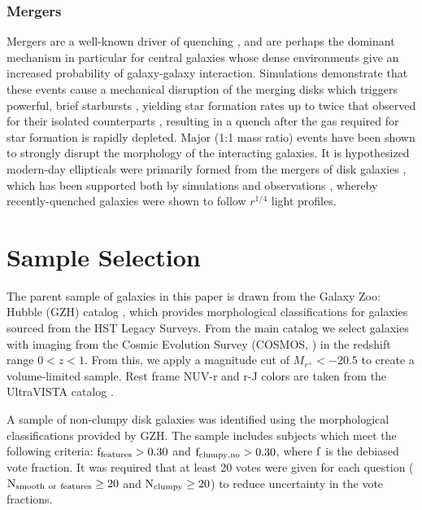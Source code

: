 \subsubsection{Mergers}
Mergers are a well-known driver of quenching \citep{Peng2010}, and are perhaps the dominant mechanism in particular for central galaxies \citet{Smethurst2017} whose dense environments give an increased probability of galaxy-galaxy interaction. Simulations demonstrate that these events cause a mechanical disruption of the merging disks \citep{Pontzen2017} which triggers powerful, brief starbursts \citep{Barnes1996,Hopkins2006}, yielding star formation rates up to twice that observed for their isolated counterparts \citep{Mihos1994}, resulting in a quench after the gas required for star formation is rapidly depleted. Major (1:1 mass ratio) events have been shown to strongly disrupt the morphology of the interacting galaxies. It is hypothesized modern-day ellipticals were primarily formed from the mergers of disk galaxies \citep{Toomre1977,Schweizer1982,Schweizer1990}, which has been supported both by simulations \citep{Mihos1996,Pontzen2017} and observations \citep{Schweizer1982,Wright1990,Stanford1991}, whereby recently-quenched galaxies were shown to follow $r^{1/4}$ light profiles. 


\section{Sample Selection}
\label{sec:reddisksample}

The parent sample of galaxies in this paper is drawn from the Galaxy Zoo: Hubble (GZH) catalog \citep{Willett2016}, which provides morphological classifications for galaxies sourced from the HST Legacy Surveys. From the main catalog we select galaxies with imaging from the Cosmic Evolution Survey (COSMOS, \citet{Scoville2007}) in the redshift range $0<z<1$. From this, we apply a magnitude cut of $M_{r^{+}}<-20.5$ to create a volume-limited sample. Rest frame NUV-r and r-J colors are taken from the UltraVISTA catalog \citep{McCracken2012,Ilbert2013}.

A sample of non-clumpy disk galaxies was identified using the morphological classifications provided by GZH. The sample includes subjects which meet the following criteria: $\rm f_{features} > 0.30$ and $\rm f_{clumpy,no} > 0.30$, where $\rm f$ is the debiased vote fraction. It was required that at least 20 votes were given for each question ($\rm N_{smooth~or~features} \ge 20$ and $\rm N_{clumpy} \ge 20$) to reduce uncertainty in the vote fractions.

